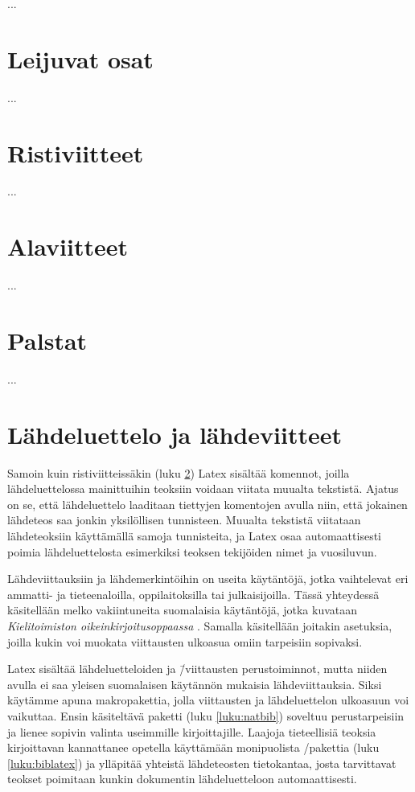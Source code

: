 ...

\section{Leijuvat osat}
\label{luku:leijuosat}

...

\section{Ristiviitteet}
\label{luku:ristiviitteet}

...

\section{Alaviitteet}
\label{luku:alaviitteet}

...

\section{Palstat}
\label{luku:palstat}

...

\section{Lähdeluettelo ja lähdeviitteet}
\label{luku:lähteet}

Samoin kuin ristiviitteissäkin (luku \ref{luku:ristiviitteet}) Latex
sisältää komennot, joilla lähdeluettelossa mainittuihin teoksiin voidaan
viitata muualta tekstistä. Ajatus on se, että lähdeluettelo laaditaan
tiettyjen komentojen avulla niin, että jokainen lähdeteos saa jonkin
yksilöllisen tunnisteen. Muualta tekstistä viitataan lähdeteoksiin
käyttämällä samoja tunnisteita, ja Latex osaa automaattisesti poimia
lähdeluettelosta esimerkiksi teoksen tekijöiden nimet ja vuosiluvun.

Lähdeviittauksiin ja lähdemerkintöihin on useita käytäntöjä, jotka
vaihtelevat eri ammatti- ja tieteen\-aloilla, oppilaitoksilla tai
julkaisijoilla. Tässä yhteydessä käsitellään melko vakiintuneita
suomalaisia käytäntöjä, jotka kuvataan \emph{Kielitoimiston
  oikein\-kir\-joi\-tus\-oppaas\-sa} \parencite{kt_oik}. Samalla
käsitellään joitakin asetuksia, joilla kukin voi muokata viittausten
ulkoasua omiin tarpeisiin sopivaksi.

Latex sisältää lähdeluetteloiden ja \=/viittausten perustoiminnot, mutta
niiden avulla ei saa yleisen suomalaisen käytännön mukaisia
lähdeviittauksia. Siksi käytämme apuna makropakettia, jolla viittausten
ja lähdeluettelon ulkoasuun voi vaikuttaa. Ensin käsiteltävä paketti
 (luku \ref{luku:natbib}) soveltuu perustarpeisiin ja
lienee sopivin valinta useimmille kirjoittajille. Laajoja tieteellisiä
teoksia kirjoittavan kannattanee opetella käyttämään monipuolista
\-/pakettia (luku \ref{luku:biblatex}) ja ylläpitää
yhteistä lähdeteosten tietokantaa, josta tarvittavat teokset poimitaan
kunkin dokumentin lähdeluetteloon automaattisesti.

